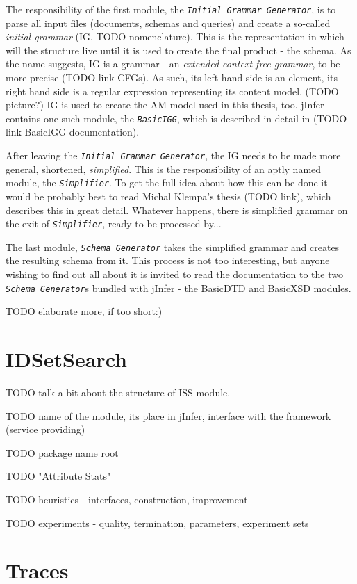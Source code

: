\documentclass[a4paper,12pt,oneside]{report}
\newcommand{\jmodule}[1]{\texttt{\textit{#1}}}
\begin{document}
The responsibility of the first module, the \jmodule{Initial Grammar Generator}, is to parse all input files (documents, schemas and queries) and create a so-called \textit{initial grammar} (IG, TODO nomenclature). This is the representation in which will the structure live until it is used to create the final product - the schema. As the name suggests, IG is a grammar - an \textit{extended context-free grammar}, to be more precise (TODO link CFGs). As such, its left hand side is an element, its right hand side is a regular expression representing its content model. (TODO picture?) IG is used to create the AM model used in this thesis, too. jInfer contains one such module, the \jmodule{BasicIGG}, which is described in detail in (TODO link BasicIGG documentation).

After leaving the \jmodule{Initial Grammar Generator}, the IG needs to be made more general, shortened, \textit{simplified}. This is the responsibility of an aptly named module, the \jmodule{Simplifier}. To get the full idea about how this can be done it would be probably best to read Michal Klempa's thesis (TODO link), which describes this in great detail. Whatever happens, there is simplified grammar on the exit of \jmodule{Simplifier}, ready to be processed by...

The last module, \jmodule{Schema Generator} takes the simplified grammar and creates the resulting schema from it. This process is not too interesting, but anyone wishing to find out all about it is invited to read the documentation to the two \jmodule{Schema Generator}s bundled with jInfer - the BasicDTD and BasicXSD modules.

TODO elaborate more, if too short:)

\chapter{IDSetSearch}
\label{iss}

TODO talk a bit about the structure of ISS module.

TODO name of the module, its place in jInfer, interface with the framework (service providing)

TODO package name root

TODO "Attribute Stats"

TODO heuristics - interfaces, construction, improvement

TODO experiments - quality, termination, parameters, experiment sets

\chapter{Traces}
\label{traces}
\end{document}
